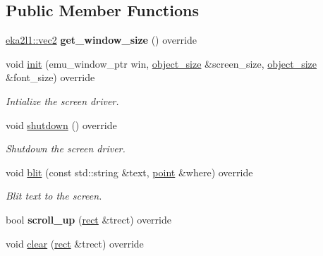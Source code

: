 \subsection*{Public Member Functions}
\begin{DoxyCompactItemize}
\item 
\mbox{\label{classeka2l1_1_1driver_1_1screen__driver__ogl_ad597786c0c026e8b2a2cc877ff0b1b56}} 
\mbox{\hyperlink{structeka2l1_1_1vec2}{eka2l1\+::vec2}} {\bfseries get\+\_\+window\+\_\+size} () override
\item 
void \mbox{\hyperlink{classeka2l1_1_1driver_1_1screen__driver__ogl_a51a7f69eb40e7ca2272c627061e010ba}{init}} (emu\+\_\+window\+\_\+ptr win, \mbox{\hyperlink{structeka2l1_1_1object__size}{object\+\_\+size}} \&screen\+\_\+size, \mbox{\hyperlink{structeka2l1_1_1object__size}{object\+\_\+size}} \&font\+\_\+size) override
\begin{DoxyCompactList}\small\item\em Intialize the screen driver. \end{DoxyCompactList}\item 
\mbox{\label{classeka2l1_1_1driver_1_1screen__driver__ogl_a3a3c73745387678ace793a56524b79f7}} 
void \mbox{\hyperlink{classeka2l1_1_1driver_1_1screen__driver__ogl_a3a3c73745387678ace793a56524b79f7}{shutdown}} () override
\begin{DoxyCompactList}\small\item\em Shutdown the screen driver. \end{DoxyCompactList}\item 
void \mbox{\hyperlink{classeka2l1_1_1driver_1_1screen__driver__ogl_ad1516779373ac8f97c42cc3dddf6cab1}{blit}} (const std\+::string \&text, \mbox{\hyperlink{structeka2l1_1_1vec2}{point}} \&where) override
\begin{DoxyCompactList}\small\item\em Blit text to the screen. \end{DoxyCompactList}\item 
\mbox{\label{classeka2l1_1_1driver_1_1screen__driver__ogl_a175ff4bfe5ce2a4200657caaa512e0a2}} 
bool {\bfseries scroll\+\_\+up} (\mbox{\hyperlink{structeka2l1_1_1rect}{rect}} \&trect) override
\item 
void \mbox{\hyperlink{classeka2l1_1_1driver_1_1screen__driver__ogl_a876d4f6acd98260c192c5b5a1f39d5f8}{clear}} (\mbox{\hyperlink{structeka2l1_1_1rect}{rect}} \&trect) override

\end{DoxyCompactItemize}
